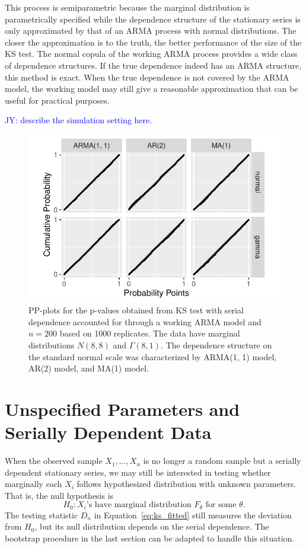 \documentclass[12pt, letterpaper, titlepage]{article}
\newcommand{\jy}[1]{\textcolor{blue}{JY: #1}}
\begin{document}
This process is semiparametric because the marginal distribution is
parametrically specified while the dependence structure of the stationary series
is only approximated by that of an ARMA process with normal distributions.
The closer the approximation is to the truth, the better
performance of the size of the KS test. The normal copula of the working ARMA
process provides a wide class of dependence structures.
If the true dependence indeed has an ARMA structure, this method is exact. When
the true dependence is not covered by the ARMA model, the working model may 
still give a reasonable approximation that can
be useful for practical purposes. 


\jy{describe the simulation setting here.}

\begin{figure}[tbp]
  \centering
  \includegraphics[width=.75\textwidth]{pp_ss.pdf}
  \caption{PP-plots for the p-values obtained from KS test with serial
    dependence accounted for through a working ARMA model and $n = 200$ based on
    1000 replicates. The data have marginal distributions $N(8, 8)$ and
    $\Gamma(8, 1)$. The dependence structure on the standard normal scale was
    characterized by ARMA(1, 1) model, AR(2) model, and MA(1) model.
  }
  \label{fig:pp_ss}
\end{figure}


\section{Unspecified Parameters and Serially Dependent Data}
\label{sec:fittedwithdependence}

When the observed sample $X_1, \ldots, X_n$ is no longer a random sample but
a serially dependent stationary series, we may still be interested in testing
whether marginally each $X_i$ follows hypothesized distribution with unknown
parameters. That is, the null hypothesis is
\[
H_0: \text{$X_i$'s have marginal distribution $F_\theta$ for some $\theta$}.
\]
The testing statistic $D_n$ in Equation~\eqref{eq:ks_fitted} still measures the
deviation from $H_0$, but its null distribution depends on the serial
dependence. The bootstrap procedure in the last section can be adapted to handle
this situation.
\end{document}

